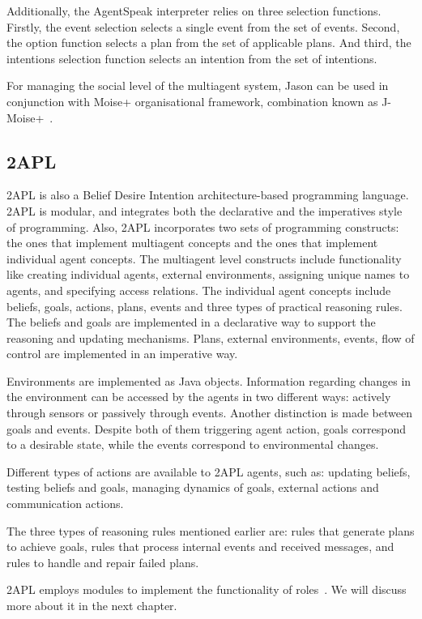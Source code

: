 \documentclass[a4paper,12pt,oneside,fleqn]{book} %
\begin{document}
Additionally, the AgentSpeak interpreter relies on three selection
functions. Firstly, the event selection selects a single event from the set
of events. Second, the option function selects a plan from the set of
applicable plans. And third, the intentions selection function selects an
intention from the set of intentions.

For managing the social level of the multiagent system, Jason can be used
in conjunction with Moise+ organisational framework, combination known as
J-Moise+~\cite{hubner2007j}.


\subsection{2APL} %
2APL is also a Belief Desire Intention architecture-based programming
language. 2APL is modular, and integrates both the declarative and the
imperatives style of programming. Also, 2APL incorporates two sets of
programming constructs: the ones that implement multiagent concepts and the
ones that implement individual agent concepts. The multiagent level
constructs include functionality like creating individual agents, external
environments, assigning unique names to agents, and specifying access
relations. The individual agent concepts include beliefs, goals, actions,
plans, events and three types of practical reasoning rules. The beliefs and
goals are implemented in a declarative way to support the reasoning and
updating mechanisms. Plans, external environments, events, flow of control
are implemented in an imperative way.

Environments are implemented as Java objects. Information regarding changes in
the environment can be accessed by the agents in two different ways:
actively through sensors or passively through events. Another distinction
is made between goals and events. Despite both of them triggering agent
action, goals correspond to a desirable state, while the events correspond
to environmental changes.

Different types of actions are available to 2APL agents, such as: updating
beliefs, testing beliefs and goals, managing dynamics of goals, external
actions and communication actions.

The three types of reasoning rules mentioned earlier are: rules that
generate plans to achieve goals, rules that process internal events and
received messages, and rules to handle and repair failed plans.

2APL employs modules to implement the functionality of
roles~\cite{dblp:conf/prima/dastanims08}. We will discuss more about it in
the next chapter.
\end{document}
